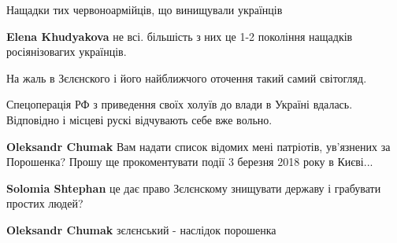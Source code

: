 \begin{itemize}
Нащадки тих червоноармійців, що винищували українців

\begin{itemize}
 
\textbf{Elena Khudyakova} не всі. більшість з них це 1-2 покоління нащадків росіянізовагих українців.
\end{itemize}

 

На жаль в Зєлєнского і його найближчого оточення такий самий світогляд.

Спецоперація РФ з приведення своїх холуїв до влади в Україні вдалась.
Відповідно і місцеві рускі відчувають себе вже вольно.

\begin{itemize}
 
\textbf{Oleksandr Chumak} Вам надати список відомих мені патріотів, ув'язнених за Порошенка? Прошу ще прокоментувати події 3 березня 2018 року в Києві...

 
\textbf{Solomia Shtephan} це дає право Зєлєнскому знищувати державу і грабувати простих людей?

 
\textbf{Oleksandr Chumak} зєлєнський - наслідок порошенка


\end{itemize}
\end{itemize}
